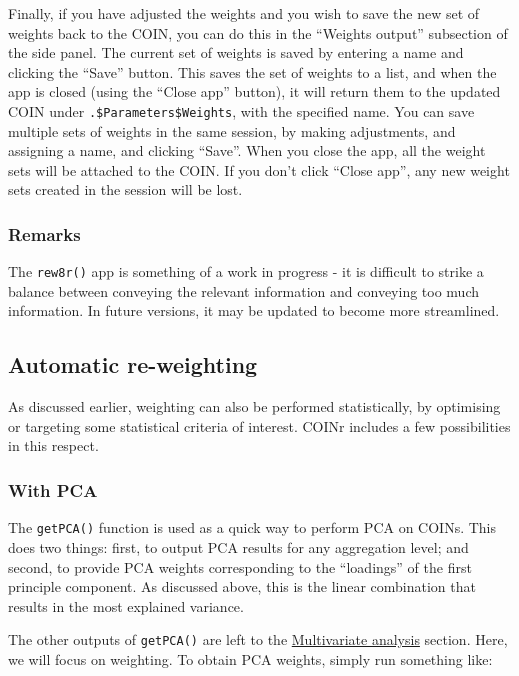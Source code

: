 \documentclass[
]{book}
\begin{document}
Finally, if you have adjusted the weights and you wish to save the new set of weights back to the COIN, you can do this in the ``Weights output'' subsection of the side panel. The current set of weights is saved by entering a name and clicking the ``Save'' button. This saves the set of weights to a list, and when the app is closed (using the ``Close app'' button), it will return them to the updated COIN under \texttt{.\$Parameters\$Weights}, with the specified name. You can save multiple sets of weights in the same session, by making adjustments, and assigning a name, and clicking ``Save''. When you close the app, all the weight sets will be attached to the COIN. If you don't click ``Close app'', any new weight sets created in the session will be lost.

\hypertarget{remarks}{%
\subsubsection{Remarks}\label{remarks}}

The \texttt{rew8r()} app is something of a work in progress - it is difficult to strike a balance between conveying the relevant information and conveying too much information. In future versions, it may be updated to become more streamlined.

\hypertarget{automatic-re-weighting}{%
\subsection{Automatic re-weighting}\label{automatic-re-weighting}}

As discussed earlier, weighting can also be performed statistically, by optimising or targeting some statistical criteria of interest. COINr includes a few possibilities in this respect.

\hypertarget{with-pca}{%
\subsubsection{With PCA}\label{with-pca}}

The \texttt{getPCA()} function is used as a quick way to perform PCA on COINs. This does two things: first, to output PCA results for any aggregation level; and second, to provide PCA weights corresponding to the ``loadings'' of the first principle component. As discussed above, this is the linear combination that results in the most explained variance.

The other outputs of \texttt{getPCA()} are left to the \protect\hyperlink{multivariate-analysis}{Multivariate analysis} section. Here, we will focus on weighting. To obtain PCA weights, simply run something like:
\end{document}
